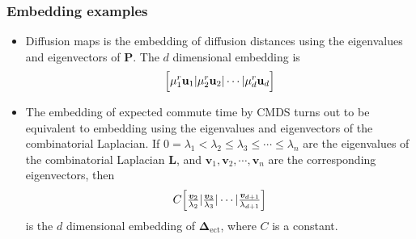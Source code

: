 \documentclass[professionalfonts,hyperref={pdfpagelabels=false,colorlinks=true,linkcolor=red}]{beamer}
\begin{document}
\begin{frame}
  \frametitle{Embedding examples}
  \begin{itemize}
    \item<1-> Diffusion maps \cite{coifman06:_diffus_maps} is the
      embedding of diffusion distances using the eigenvalues and
      eigenvectors of $\mathbf{P}$. The $d$ dimensional embedding is
      \begin{equation*}
        \Bigl[ \mu_1^{r} \mathbf{u}_1 | \mu_{2}^{r} \mathbf{u}_2 |
        \cdots | \mu_{d}^{r}  \mathbf{u}_d \Bigr]
      \end{equation*}
    \item<2> The embedding of expected commute time by CMDS turns out
      to be equivalent to embedding using the eigenvalues and
      eigenvectors of the combinatorial
      Laplacian. If $0 = \lambda_1 < \lambda_2 \leq \lambda_3 \leq \cdots
      \leq \lambda_{n}$ are the eigenvalues of the combinatorial
      Laplacian $\mathbf{L}$, and $\bm{v}_1, \bm{v}_2, \cdots,
      \bm{v}_n$ are the corresponding eigenvectors, then
      \begin{equation}
        \label{eq:1}
        C \Bigl[ \tfrac{\bm{v}_{2}}{\lambda_2} |
        \tfrac{\bm{v}_3}{\lambda_3}
        | \cdots | \tfrac{\bm{v}_{d+1}}{\lambda_{d+1}} \Bigr]
      \end{equation}
      is the $d$ dimensional embedding of
      $\bm{\Delta}_{\mathrm{ect}}$, where $C$ is a constant.  
  \end{itemize}
\end{frame}

\begin{frame}

\end{frame}
\end{document}
